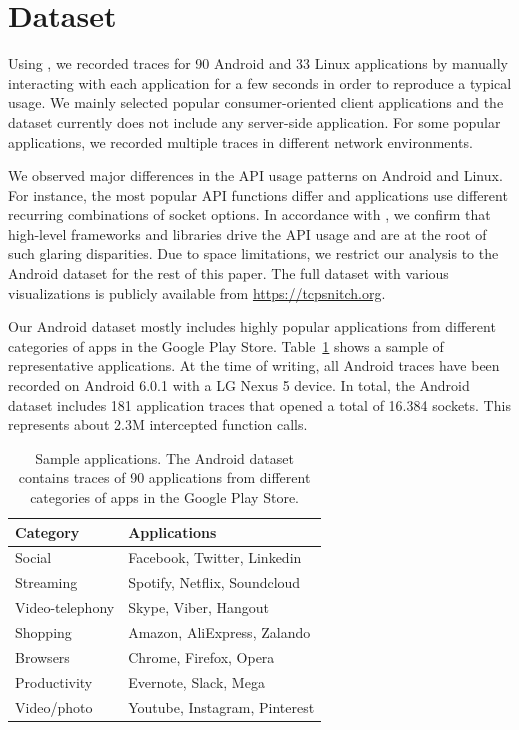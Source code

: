 \section{Dataset}\label{sec:dataset}

Using \tcpsnitchns, we recorded traces for 90 Android and 33 Linux
applications by manually interacting with each application for a few seconds
in order to reproduce a typical usage. We mainly selected popular
consumer-oriented client applications and the dataset currently does not
include any server-side application. For some popular applications, we recorded
multiple traces in different network environments.

We observed major differences in the API usage patterns on Android and Linux.
For instance, the most popular API functions differ and applications use
different recurring combinations of socket options. In accordance with
\cite{Atlidakis:POSIX}, we confirm that high-level frameworks and libraries
drive the API usage and are at the root of such glaring
disparities. Due to space limitations, we restrict our analysis to the
Android dataset for the rest of this paper. The full dataset with
various visualizations is publicly available from \url{https://tcpsnitch.org}.

Our Android dataset mostly includes highly popular applications from different
categories of apps in the Google Play Store. Table~\ref{tab:apps} shows a
sample of representative applications. At the time of writing, all Android
traces have been recorded on Android 6.0.1 with a LG Nexus 5 device.
In total, the Android dataset includes 181 application traces
that opened a total of 16.384 sockets. This represents about 2.3M intercepted
function calls.

\begin{table}[]
    \centering
    \begin{tabular}{ll}
        \hline
        \multicolumn{1}{|l|}{\textbf{Category}} & \multicolumn{1}{l|}{\textbf{Applications}} \\ \hline
        Social                                  & Facebook, Twitter, Linkedin                \\
        Streaming                               & Spotify, Netflix, Soundcloud               \\
        Video-telephony                         & Skype, Viber, Hangout                      \\
        Shopping                                & Amazon, AliExpress,  Zalando               \\
        Browsers                                & Chrome, Firefox, Opera                     \\
        Productivity                            & Evernote, Slack, Mega                      \\
        Video/photo                             & Youtube, Instagram, Pinterest
    \end{tabular}
    \caption{Sample applications. \textmd{The Android dataset contains traces
of 90 applications from different categories of apps in the Google Play Store.}}
    \label{tab:apps}
\end{table}


